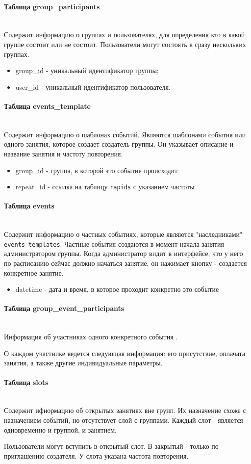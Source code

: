 \documentclass{disser}
\newcommand{\myparagraph}[1]{\paragraph{#1}\mbox{}\\}
\begin{document}
\myparagraph{Таблица group\_participants}

Содержит информацию о группах и пользователях, для определения кто в какой группе состоит или не состоит.
Пользователи могут состоять в сразу нескольких группах.

\begin{itemize}
    \item group\_id - уникальный идентификатор группы; 
    \item user\_id - уникальный идентификатор пользователя.
\end{itemize}

\myparagraph{Таблица events\_template}
Содержит информацию о шаблонах событий. Являются шаблонами события или одного занятия, которое создает создатель группы. Он указывает описание и название занятия и частоту повторения.

\begin{itemize}
    \item group\_id - группа, в которой это событие происходит
    \item repeat\_id - ссылка на таблицу \texttt{rapids} с указанием частоты
\end{itemize}

\myparagraph{Таблица events}

Содержит информацию о частных событиях, которые являются "наследниками" \texttt{events\_templates}. 
Частные события создаются в момент начала занятия администратором группы. Когда администратор видит в интерфейсе, что у него по расписанию сейчас должно начаться занятие, он нажимает кнопку - создается конкретное занятие.
\begin{itemize}
    \item datetime - дата и время, в которое проходит конкретно это событие
\end{itemize}


\myparagraph{Таблица group\_event\_participants}


Информация об участниках одного конкретного события .

О каждом участнике ведется следующая информация: его присутствие, оплачата занятия, а также другие индивидуальные параметры.

\myparagraph{Таблица slots}

Содержит ифнормацию об открытых занятиях вне групп. Их назначение схоже с назначением событий, но отсутствует слой с группами. Каждый слот - является одновременно и группой, и занятием.

Пользователи могут вступить в открытый слот. В закрытый - только по приглашению создателя. У слота указана частота повторения.
\end{document}
